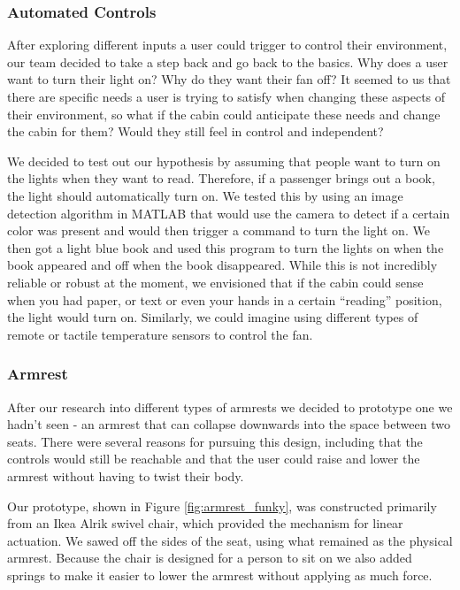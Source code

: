 \subsubsection*{Automated Controls}

After exploring different inputs a user could trigger to control their environment, our team decided to take a step back and go back to the basics. Why does a user want to turn their light on? Why do they want their fan off? It seemed to us that there are specific needs a user is trying to satisfy when changing these aspects of their environment, so what if the cabin could anticipate these needs and change the cabin for them? Would they still feel in control and independent? 

We decided to test out our hypothesis by assuming that people want to turn on the lights when they want to read. Therefore, if a passenger brings out a book, the light should automatically turn on. We tested this by using an image detection algorithm in MATLAB that would use the camera to detect if a certain color was present and would then trigger a command to turn the light on. We then got a light blue book and used this program to turn the lights on when the book appeared and off when the book disappeared. While this is not incredibly reliable or robust at the moment, we envisioned that if the cabin could sense when you had paper, or text or even your hands in a certain “reading” position, the light would turn on. Similarly, we could imagine using different types of remote or tactile temperature sensors to control the fan.

\subsubsection*{Armrest}
After our research into different types of armrests we decided to prototype one we hadn't seen - an armrest that can collapse downwards into the space between two seats. There were several reasons for pursuing this design, including that the controls would still be reachable and that the user could raise and lower the armrest without having to twist their body.

Our prototype, shown in Figure \ref{fig:armrest_funky}, was constructed primarily from an Ikea Alrik swivel chair, which provided the mechanism for linear actuation. We sawed off the sides of the seat, using what remained as the physical armrest. Because the chair is designed for a person to sit on we also added springs to make it easier to lower the armrest without applying as much force.



